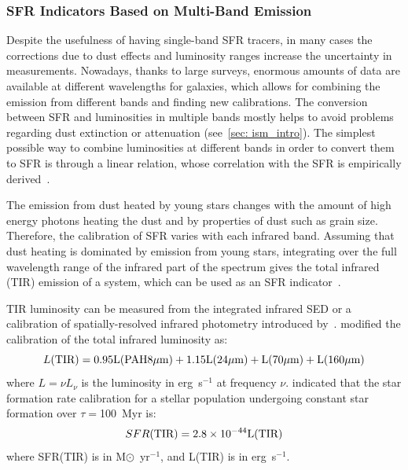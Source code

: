 \subsubsection*{SFR Indicators Based on Multi-Band Emission}

Despite the usefulness of having single-band SFR tracers, in many cases the corrections due to dust effects and luminosity ranges increase the uncertainty in measurements.
Nowadays, thanks to large surveys, enormous amounts of data are available at different wavelengths for galaxies, which allows for combining the emission from different bands and finding new calibrations.
The conversion between SFR and luminosities in multiple bands mostly helps to avoid problems regarding dust extinction or attenuation (see~\ref{sec: ism_intro}). 
The simplest possible way to combine luminosities at different bands in order to convert them to SFR is through a linear relation, whose correlation with the SFR is empirically derived~\citep{Kennicutt12}.

The emission from dust heated by young stars changes with the amount of high energy photons heating the dust and by properties of dust such as grain size.
Therefore, the calibration of SFR varies with each infrared band.
Assuming that dust heating is dominated by emission from young stars, integrating over the full wavelength range of the infrared part of the spectrum gives the total infrared (TIR) emission of a system, which can be used as an SFR indicator~\citep{Kennicutt98b}. 
 
TIR luminosity can be measured from the integrated infrared SED or a calibration of spatially-resolved infrared photometry introduced by~\cite{Draine07}. 
\cite{Boquien10} modified the calibration of the total infrared luminosity as: 
\begin{equation}
L(\rm TIR) = 0.95L(PAH 8 \mu m) + 1.15L(24 \mu m) + L(70 \mu m) + L(160 \mu m)
\end{equation}
where $L = \nu L_{\nu}$ is the luminosity in erg~s$^{-1}$ at frequency $\nu$. 
\cite{Calzetti07} indicated that the star formation rate calibration for a stellar population undergoing constant star formation over $\tau=$100~Myr is:
\begin{equation}
\label{sfr_tot_IR}
SFR(\rm TIR) = 2.8 \times10^{-44}L(\rm TIR)
\end{equation}
where SFR(TIR) is in M${\odot}$~yr$^{-1}$, and L(TIR) is in erg~s$^{-1}$. 


